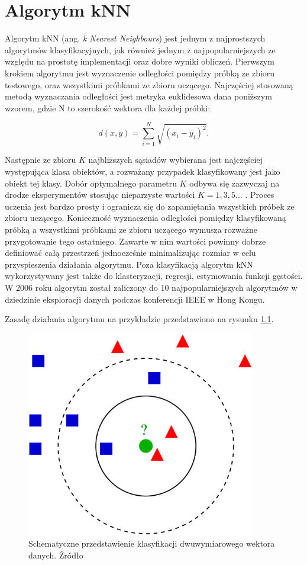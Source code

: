 \chapter{Algorytm kNN}
\label{chap:knn}
Algorytm kNN (ang. \textit{k Nearest Neighbours})  jest jednym z najprostszych algorytmów klasyfikacyjnych, jak również jednym z najpopularniejszych ze względu na prostotę implementacji oraz dobre wyniki obliczeń. Pierwszym krokiem algorytmu jest wyznaczenie odległości pomiędzy próbką ze zbioru testowego, oraz wszystkimi próbkami ze zbioru uczącego. Najczęściej stosowaną metodą wyznaczania odległości jest metryka euklidesowa dana poniższym wzorem, gdzie N to szerokość wektora dla każdej próbki:

\begin{equation}
d(x,y) = \sum_{i=1}^{N} \sqrt{(x_i - y_i)^2}.
\end{equation}

Następnie ze zbioru $K$ najbliższych sąsiadów wybierana jest najczęściej występująca klasa obiektów, a rozważany przypadek klasyfikowany jest jako obiekt tej klasy. Dobór optymalnego parametru $K$ odbywa się zazwyczaj na drodze eksperymentów stosując nieparzyste wartości $K=1,3,5...$ . Proces uczenia jest bardzo prosty i ogranicza się do zapamiętania wszystkich próbek ze zbioru uczącego. Konieczność wyznaczenia odległości pomiędzy klasyfikowaną próbką a wszystkimi próbkami ze zbioru uczącego wymusza rozważne przygotowanie tego ostatniego. Zawarte w nim wartości powinny dobrze definiować całą przestrzeń jednocześnie minimalizując rozmiar w celu przyspieszenia działania algorytmu.  Poza klasyfikacją algorytm kNN wykorzystywany jest także do klasteryzacji, regresji, estymowania funkcji gęstości. W 2006 roku algorytm został zaliczony do 10 najpopularniejszych algorytmów w dziedzinie eksploracji danych podczas konferencji IEEE w Hong Kongu.

Zasadę działania algorytmu na przykładzie przedstawiono na rysunku \ref{fig:knn-idea}.

\begin{figure}[H]
	\centering
	\includegraphics[width=10cm]{img/KnnClassification}
	\caption{Schematyczne przedstawienie klasyfikacji dwuwymiarowego wektora danych. Źródło \cite{knn-wiki}}
	\label{fig:knn-idea}
\end{figure}

